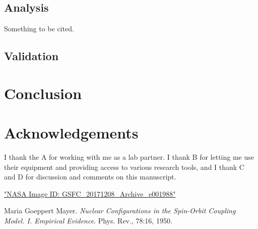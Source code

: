 \documentclass[12pt]{article}
\begin{document}
\subsection{Analysis}
\lipsum[7]  
Something to be cited.\cite{goeppert_mayer}
\lipsum[2]

\subsection{Validation}
\lipsum[9]

\section{Conclusion}
\lipsum[10]

\section*{Acknowledgements}
I thank the A for working with me as a lab partner. I thank B for letting me use their equipment and providing access to various research tools, and I thank C and D for discussion and comments on this manuscript.

\begin{thebibliography}{}

\href{images-assets.nasa.gov/image/GSFC_20171208_Archive_e001988/GSFC_20171208_Archive_e001988~orig.jpg}{"NASA Image ID: GSFC\_20171208\_Archive\_e001988"}

Maria Goeppert Mayer. 
\textit{Nuclear Configurations in the Spin-Orbit Coupling Model. I. Empirical Evidence}.
Phys. Rev., 78:16, 1950.

\end{thebibliography}
\end{document}
